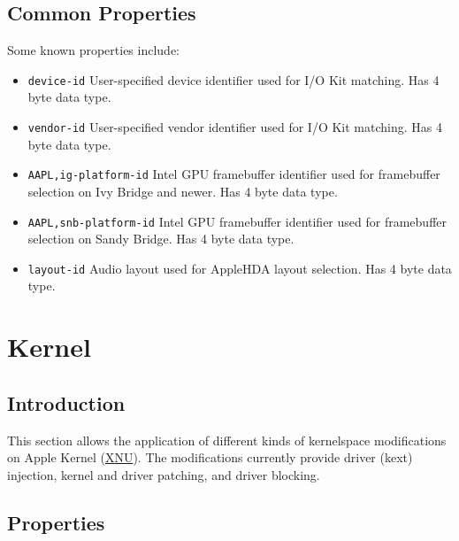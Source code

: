 \documentclass[]{article}
\providecommand{\tightlist}{%
  \setlength{\itemsep}{0pt}\setlength{\parskip}{0pt}}
\begin{document}
\subsection{Common Properties}\label{devpropscommon}

Some known properties include:

\begin{itemize}
\tightlist
\item
  \texttt{device-id}
  \break
  User-specified device identifier used for I/O Kit matching. Has 4 byte data type.
\item
  \texttt{vendor-id}
  \break
  User-specified vendor identifier used for I/O Kit matching. Has 4 byte data type.
\item
  \texttt{AAPL,ig-platform-id}
  \break
  Intel GPU framebuffer identifier used for framebuffer selection on Ivy Bridge and newer.
  Has 4 byte data type.
\item
  \texttt{AAPL,snb-platform-id}
  \break
  Intel GPU framebuffer identifier used for framebuffer selection on Sandy Bridge.
  Has 4 byte data type.
\item
  \texttt{layout-id}
  \break
  Audio layout used for AppleHDA layout selection. Has 4 byte data type.
\end{itemize}


\section{Kernel}\label{kernel}

\subsection{Introduction}\label{kernelintro}

This section allows the application of different kinds of kernelspace modifications on
Apple Kernel (\href{https://opensource.apple.com/source/xnu}{XNU}). The modifications
currently provide driver (kext) injection, kernel and driver patching, and driver
blocking.

\subsection{Properties}\label{kernelprops}
\end{document}
